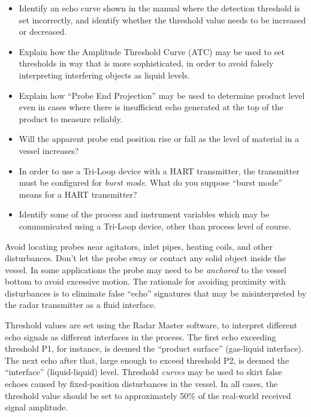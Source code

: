 \begin{itemize}
\item{} Identify an echo curve shown in the manual where the detection threshold is set incorrectly, and identify whether the threshold value needs to be increased or decreased.
\item{} Explain how the Amplitude Threshold Curve (ATC) may be used to set thresholds in way that is more sophisticated, in order to avoid falsely interpreting interfering objects as liquid levels.
\item{} Explain how ``Probe End Projection'' may be used to determine product level even in cases where there is insufficient echo generated at the top of the product to measure reliably.
\item{} Will the apparent probe end position rise or fall as the level of material in a vessel increases?
\item{} In order to use a Tri-Loop device with a HART transmitter, the transmitter must be configured for {\it burst mode}.  What do you suppose ``burst mode'' means for a HART transmitter?
\item{} Identify some of the process and instrument variables which may be communicated using a Tri-Loop device, other than process level of course.
\end{itemize}














Avoid locating probes near agitators, inlet pipes, heating coils, and other disturbances.  Don't let the probe sway or contact any solid object inside the vessel.  In some applications the probe may need to be {\it anchored} to the vessel bottom to avoid excessive motion.  The rationale for avoiding proximity with disturbances is to eliminate false ``echo'' signatures that may be misinterpreted by the radar transmitter as a fluid interface.

\vskip 10pt

Threshold values are set using the Radar Master software, to interpret different echo signals as different interfaces in the process.  The first echo exceeding threshold P1, for instance, is deemed the ``product surface'' (gas-liquid interface).  The next echo after that, large enough to exceed threshold P2, is deemed the ``interface'' (liquid-liquid) level.  Threshold {\it curves} may be used to skirt false echoes caused by fixed-position disturbances in the vessel.  In all cases, the threshold value should be set to approximately 50\% of the real-world received signal amplitude.

